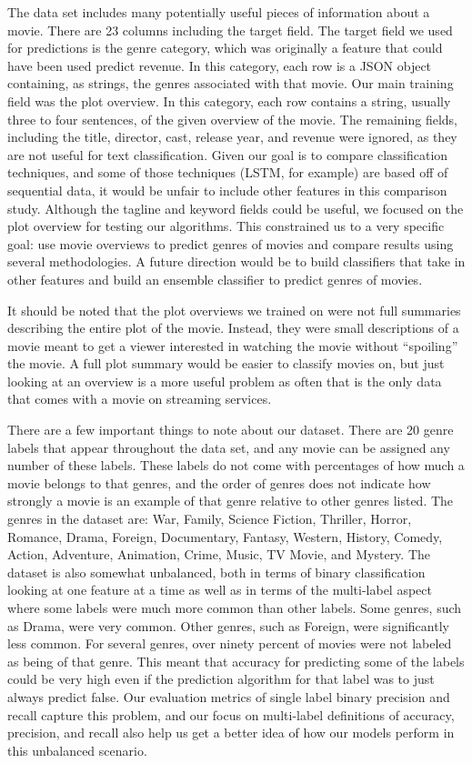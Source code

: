 \documentclass[sigconf]{acmart}
\begin{document}
The data set includes many potentially useful pieces of information about a movie. There are 23 columns including the target field. The target field we used for predictions is the genre category, which was originally a feature that could have been used predict revenue. In this category, each row is a JSON object containing, as strings, the genres associated with that movie. Our main training field was the plot overview. In this category, each row contains a string, usually three to four sentences, of the given overview of the movie. The remaining fields, including the title, director, cast, release year, and revenue were ignored, as they are not useful for text classification. Given our goal is to compare classification techniques, and some of those techniques (LSTM, for example) are based off of sequential data, it would be unfair to include other features in this comparison study. Although the tagline and keyword fields could be useful, we focused on the plot overview for testing our algorithms. This constrained us to a very specific goal: use movie overviews to predict genres of movies and compare results using several methodologies. A future direction would be to build classifiers that take in other features and build an ensemble classifier to predict genres of movies. 

It should be noted that the plot overviews we trained on were not full summaries describing the entire plot of the movie.  Instead, they were small descriptions of a movie meant to get a viewer interested in watching the movie without ``spoiling'' the movie.  A full plot summary would be easier to classify movies on, but just looking at an overview is a more useful problem as often that is the only data that comes with a movie on streaming services. 

There are a few important things to note about our dataset.  There are 20 genre labels that appear throughout the data set, and any movie can be assigned any number of these labels.  These labels do not come with percentages of how much a movie belongs to that genres, and the order of genres does not indicate how strongly a movie is an example of that genre relative to other genres listed.  The genres in the dataset are: War, Family, Science Fiction, Thriller, Horror, Romance, Drama, Foreign, Documentary, Fantasy, Western, History, Comedy, Action, Adventure, Animation, Crime, Music, TV Movie, and Mystery. The dataset is also somewhat unbalanced, both in terms of binary classification looking at one feature at a time as well as in terms of the multi-label aspect where some labels were much more common than other labels.  Some genres, such as Drama, were very common.  Other genres, such as Foreign, were significantly less common. For several genres, over ninety percent of movies were not labeled as being of that genre. This meant that accuracy for predicting some of the labels could be very high even if the prediction algorithm for that label was to just always predict false.  Our evaluation metrics of single label binary precision and recall capture this problem, and our focus on multi-label definitions of accuracy, precision, and recall also help us get a better idea of how our models perform in this unbalanced scenario. 
\end{document}
